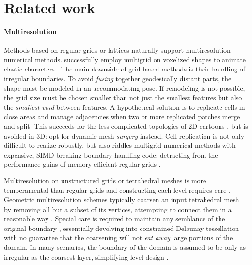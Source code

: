 
\section{Related work}
\label{sec:related}

\paragraph{Multiresolution}
%
Methods based on regular grids or lattices naturally support multiresolution numerical methods.
%
\cite{McAdams:2011}
successfully employ multigrid on voxelized shapes to animate
elastic characters..
%
The main downside of grid-based methods is their handling of irregular
boundaries.
%
%
To avoid \emph{fusing} together geodesically distant parts, the
shape must be modeled in an accommodating pose. If remodeling is not
possible, the grid size must be chosen smaller than not just the smallest
features but also the \emph{smallest void} between features.
%
A hypothetical solution is to replicate cells in close areas and manage
adjacencies when two or more replicated patches merge and split.
%
This succeeds for the less complicated topologies of 2D cartoons
\cite{Sykora09}, but is avoided in 3D: 
\cite{wojtan2011liquid} opt for dynamic mesh \emph{surgery} instead.
%
%
Cell replication is not only difficult to realize robustly, but also riddles
multigrid numerical methods with expensive, SIMD-breaking boundary handling
code: detracting from the performance gains of memory-efficient regular grids
\cite{Demmel04}.

Multiresolution on unstructured grids or tetrahedral meshes is more
temperamental than regular grids and constructing each level requires care
\cite{fish1995efficient}.
%
Geometric multiresolution schemes typically coarsen an input tetrahedral mesh
by removing all but a subset of its vertices, attempting to connect them in a
reasonable way \cite{guillard1993,Adams:1999:PMS}. Special care is required to
maintain any semblance of the original boundary \cite{Brune:2011}, essentially
devolving into constrained Delaunay tessellation with no guarantee that the
coarsening will not \emph{eat away} large portions of the domain.
%
In many scenarios, the boundary of the domain is assumed to be only as
irregular as the coarsest layer, simplifying level design \cite{feng1997non}.

